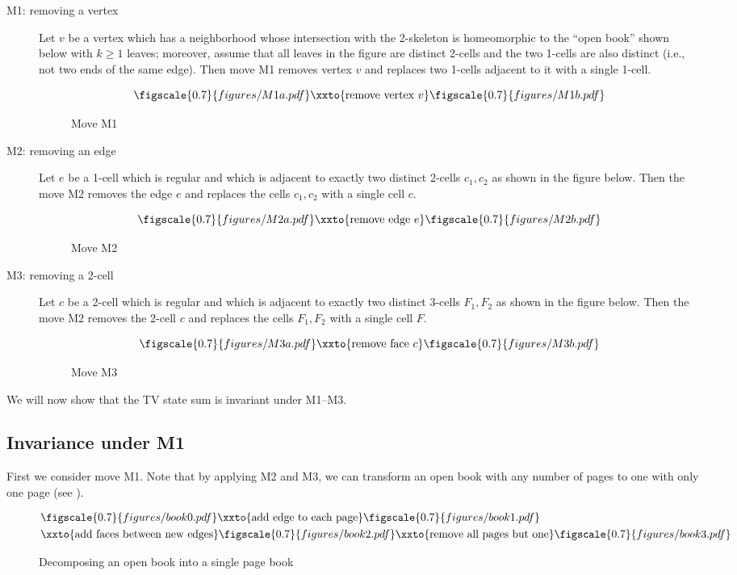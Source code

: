 \begin{description}
	\item[M1: removing a vertex]
	Let $v$ be a vertex which has a neighborhood whose intersection with 
	the 2-skeleton is homeomorphic to the ``open book'' shown below with
	$k\ge 1$     leaves;    moreover, assume that all leaves in the
	figure are distinct 2-cells and the two
	1-cells  are also  distinct (i.e., not two ends of the same
	edge). Then move M1 removes vertex $v$ and replaces two 1-cells
	adjacent to it with a single 1-cell.
\begin{figure}[ht]
	$$\figscale{0.7}{figures/M1a.pdf}
	\xxto{\text{remove vertex } v}
	\figscale{0.7}{figures/M1b.pdf}
	$$
	\caption{Move M1}\label{f:movef1}
\end{figure}
	
	\item[M2: removing an edge]
	Let $e$ be a 1-cell which is regular and which is 
	adjacent to exactly two distinct 2-cells $c_1, c_2$ as shown in the
	figure below.  Then the move M2 removes the edge $e$ and replaces
	the cells $c_1,c_2$ with a  single cell $c$. 
\begin{figure}[ht]
	$$\figscale{0.7}{figures/M2a.pdf}
	\xxto{\text{remove edge } e}
	\figscale{0.7}{figures/M2b.pdf}
	$$
	\caption{Move M2}\label{f:movef2}
\end{figure}
	
	\item[M3: removing a 2-cell]
	Let $c$ be a 2-cell which is regular  and which is 
	adjacent to exactly two distinct 3-cells $F_1, F_2$ as shown in the
	figure below.  Then the move M2 removes the 2-cell $c$ and replaces the
	cells $F_1,F_2$ with a single cell $F$.
\begin{figure}[ht]
	$$\figscale{0.7}{figures/M3a.pdf}
	\xxto{\text{remove face } c}
	\figscale{0.7}{figures/M3b.pdf}
	$$
	\caption{Move M3}\label{f:movef3}
\end{figure}
	
\end{description}



We will now show that the TV state sum is invariant under M1--M3.

\subsection*{Invariance under M1}
First we consider move M1. Note that by applying M2 and M3, we can
transform an open book  with any number of pages to one with only one page
(see ). 
\begin{figure}[ht]
	\begin{align*}&\figscale{0.7}{figures/book0.pdf}
		\xxto{\text{add edge to each page}}
		\figscale{0.7}{figures/book1.pdf}
		\\
		& \xxto{\text{add faces between new edges}}
		\figscale{0.7}{figures/book2.pdf}
		\xxto{\text{remove all pages but one}}  
		\figscale{0.7}{figures/book3.pdf} 
	\end{align*}
	\caption{Decomposing an open book into a single page book}\label{f:book}
\end{figure} 


